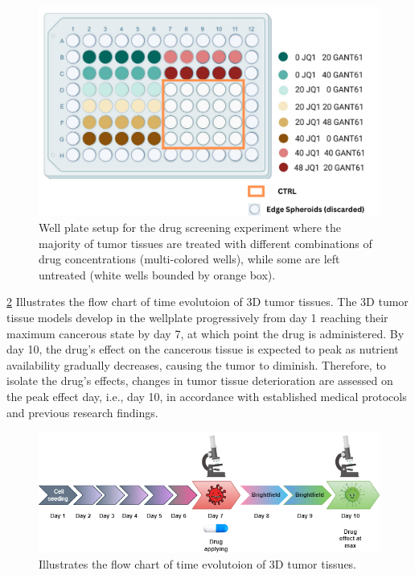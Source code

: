 \begin{figure}[H]
  \centering
  \includegraphics[width=1\linewidth]{figures/drug_screened.png} %
  \caption{Well plate setup for the drug screening experiment where the majority of tumor tissues are treated with different combinations of drug 
  concentrations (multi-colored wells), while some are left untreated (white wells bounded by orange box).}
  \label{fig:Drug screen wellplate}
\end{figure}

\ref{fig:time} Illustrates the flow chart of time evolutoion of 3D tumor tissues.
The 3D tumor tissue models develop in the wellplate progressively from day 1 reaching their maximum cancerous state by day 7, at which point the drug is 
administered. By day 10, the drug's effect on the cancerous tissue is expected to peak as nutrient availability gradually decreases, causing the tumor to 
diminish. Therefore, to isolate the drug's effects, changes in tumor tissue deterioration are assessed on the peak effect day, i.e., day 10, in 
accordance with established medical protocols and previous research findings.

\begin{figure}[H]
  \centering
  \includegraphics[scale=0.7]{figures/timed.png} 
  \caption{Illustrates the flow chart of time evolutoion of 3D tumor tissues.}
  \label{fig:time}
\end{figure}
\let\cleardoublepage\clearpage

